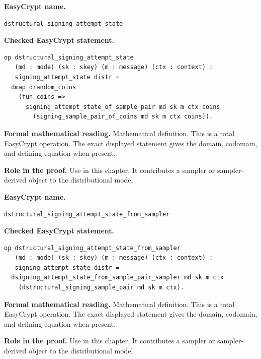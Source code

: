 \begin{formaldefinition}
\noindent\textbf{EasyCrypt name.}
\begin{lstlisting}[language=EasyCrypt,basicstyle=\ttfamily\scriptsize]
dstructural_signing_attempt_state
\end{lstlisting}
\noindent\textbf{Checked EasyCrypt statement.}
\begin{lstlisting}[language=EasyCrypt,basicstyle=\ttfamily\scriptsize]
op dstructural_signing_attempt_state
   (md : mode) (sk : skey) (m : message) (ctx : context) :
   signing_attempt_state distr =
  dmap drandom_coins
    (fun coins =>
      signing_attempt_state_of_sample_pair md sk m ctx coins
        (signing_sample_pair_of_coins md sk m ctx coins)).
\end{lstlisting}
\noindent\textbf{Formal mathematical reading.}
Mathematical definition. This is a total EasyCrypt operation.  The exact displayed statement gives the domain, codomain, and defining equation when present.

\noindent\textbf{Role in the proof.}
Use in this chapter. It contributes a sampler or sampler-derived object to the distributional model.

\end{formaldefinition}

\begin{formaldefinition}
\noindent\textbf{EasyCrypt name.}
\begin{lstlisting}[language=EasyCrypt,basicstyle=\ttfamily\scriptsize]
dstructural_signing_attempt_state_from_sampler
\end{lstlisting}
\noindent\textbf{Checked EasyCrypt statement.}
\begin{lstlisting}[language=EasyCrypt,basicstyle=\ttfamily\scriptsize]
op dstructural_signing_attempt_state_from_sampler
   (md : mode) (sk : skey) (m : message) (ctx : context) :
   signing_attempt_state distr =
  dsigning_attempt_state_from_sample_pair_sampler md sk m ctx
    (dstructural_signing_sample_pair md sk m ctx).
\end{lstlisting}
\noindent\textbf{Formal mathematical reading.}
Mathematical definition. This is a total EasyCrypt operation.  The exact displayed statement gives the domain, codomain, and defining equation when present.

\noindent\textbf{Role in the proof.}
Use in this chapter. It contributes a sampler or sampler-derived object to the distributional model.

\end{formaldefinition}

